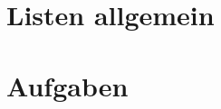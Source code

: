 \documentclass{lehramt-informatik-haupt}
\begin{document}

\chapter{Listen allgemein}


\chapter{Aufgaben}

\literatur
\end{document}
